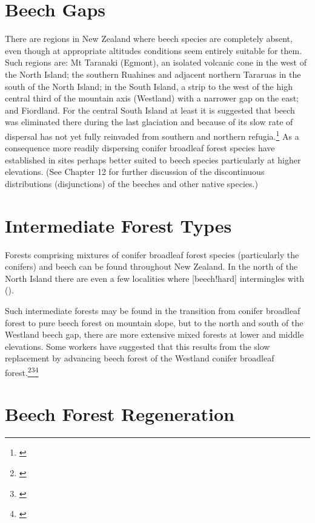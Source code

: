 \section{Beech Gaps}

There are regions in New Zealand where beech species are completely absent, even though at appropriate altitudes conditions seem entirely suitable for them.
Such regions are: Mt Taranaki (Egmont), an isolated volcanic cone in the west of the North Island; the southern Ruahines and adjacent northern Tararuas in the south of the North Island; in the South Island, a strip to the west of the high central third of the mountain axis (Westland) with a narrower gap on the east; and Fiordland.
For the central South Island at least it is suggested that beech was eliminated there during the last glaciation and because of its slow rate of dispersal has not yet fully reinvaded from southern and northern refugia.\footnote{\cite{wardle1965comparison}}
As a consequence more readily dispersing conifer broadleaf forest species have established in sites perhaps better suited to beech species particularly at higher elevations. (See Chapter 12 for further discussion of the discontinuous distributions (disjunctions) of the beeches and other native species.)

\section{Intermediate Forest Types}

Forests comprising mixtures of conifer broadleaf forest species (particularly the conifers) and beech can be found throughout New Zealand.
In the north of the North Island there are even a few localities where [beech!hard] intermingles with  ().

Such intermediate forests may be found in the transition from conifer broadleaf forest to pure beech forest on mountain slope, but to the north and south of the Westland beech gap, there are more extensive mixed forests at lower and middle elevations.
Some workers have suggested that this results from the slow replacement by advancing beech forest of the Westland conifer broadleaf forest.\footnote{\cite{holloway1954forests}}\footnote{\cite{wardle1964facets}}\footnote{\cite{wardle1980ecology}}

\section{Beech Forest Regeneration}


